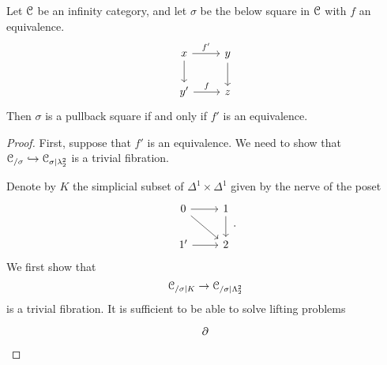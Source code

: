 \documentclass[main.tex]{subfiles}
\begin{document}
\begin{lemma}
  \label{lemma:pullback_along_equivalence_condition}
  Let $\mathcal{C}$ be an infinity category, and let $\sigma$ be the below square in $\mathcal{C}$ with $f$ an equivalence.
  \begin{equation*}
    \begin{tikzcd}
      x
      \arrow[r, "f'"]
      \arrow[d]
      & y
      \arrow[d]
      \\
      y'
      \arrow[r, "f"]
      & z
    \end{tikzcd}
  \end{equation*}
  Then $\sigma$ is a pullback square if and only if $f'$ is an equivalence.
\end{lemma}
\begin{proof}
  First, suppose that $f'$ is an equivalence. We need to show that $\mathcal{C}_{/\sigma} \hookrightarrow \mathcal{C}_{\sigma|\lambda^{2}_{2}}$ is a trivial fibration.

  Denote by $K$ the simplicial subset of $\Delta^{1} \times \Delta^{1}$ given by the nerve of the poset
  \begin{equation*}
    \begin{tikzcd}
      0
      \arrow[dr]
      \arrow[r]
      & 1
      \arrow[d]
      \\
      1'
      \arrow[r]
      & 2
    \end{tikzcd}.
  \end{equation*}
  We first show that
  \begin{equation*}
    \mathcal{C}_{/\sigma|K} \to \mathcal{C}_{/\sigma|\Lambda^{2}_{2}}
  \end{equation*}
  is a trivial fibration. It is sufficient to be able to solve lifting problems
  \begin{equation*}
    \begin{tikzcd}
      \partial
    \end{tikzcd}
  \end{equation*}


\end{proof}
\end{document}
